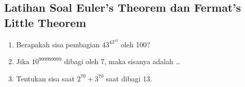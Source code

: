 \subsection{Latihan Soal Euler's Theorem dan Fermat's Little Theorem}
\begin{enumerate}
    \item Berapakah sisa pembagian $43^{43^{43}}$ oleh 100?
    
    \item Jika $10^{999999999}$ dibagi oleh 7, maka sisanya adalah \dots
    
    \item Tentukan sisa saat $2^{70}+3^{70}$ saat dibagi 13.
\end{enumerate}